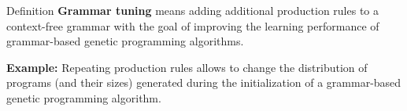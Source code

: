 \begin{frame}
\vspace*{2mm}
\begin{block}{
Definition
}
{\bf Grammar tuning} means adding additional production rules
to a context-free grammar with the goal of improving the learning
performance of grammar-based genetic programming algorithms.
 
{\bf Example:} Repeating production rules allows to change the distribution
of programs (and their sizes) generated during the initialization of a grammar-based
genetic programming algorithm.
\end{block}
\end{frame}